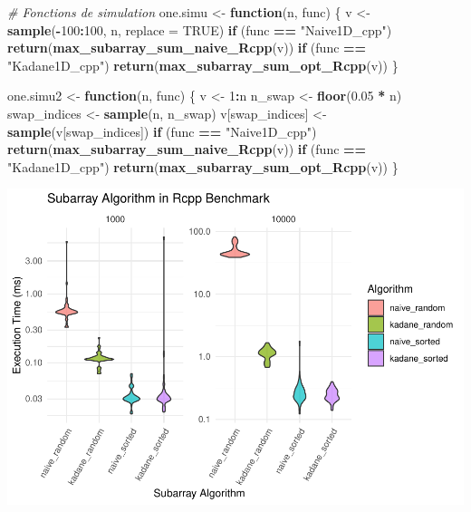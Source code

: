 \documentclass[
]{article}
\newenvironment{Shaded}{\begin{snugshade}}{\end{snugshade}}
\newcommand{\AttributeTok}[1]{\textcolor[rgb]{0.13,0.29,0.53}{#1}}
\newcommand{\CommentTok}[1]{\textcolor[rgb]{0.56,0.35,0.01}{\textit{#1}}}
\newcommand{\ConstantTok}[1]{\textcolor[rgb]{0.56,0.35,0.01}{#1}}
\newcommand{\ControlFlowTok}[1]{\textcolor[rgb]{0.13,0.29,0.53}{\textbf{#1}}}
\newcommand{\DecValTok}[1]{\textcolor[rgb]{0.00,0.00,0.81}{#1}}
\newcommand{\FloatTok}[1]{\textcolor[rgb]{0.00,0.00,0.81}{#1}}
\newcommand{\FunctionTok}[1]{\textcolor[rgb]{0.13,0.29,0.53}{\textbf{#1}}}
\newcommand{\NormalTok}[1]{#1}
\newcommand{\OtherTok}[1]{\textcolor[rgb]{0.56,0.35,0.01}{#1}}
\newcommand{\SpecialCharTok}[1]{\textcolor[rgb]{0.81,0.36,0.00}{\textbf{#1}}}
\newcommand{\StringTok}[1]{\textcolor[rgb]{0.31,0.60,0.02}{#1}}
\begin{document}
\begin{Shaded}
\begin{Highlighting}[]
\CommentTok{\# Fonctions de simulation}
\NormalTok{one.simu }\OtherTok{\textless{}{-}} \ControlFlowTok{function}\NormalTok{(n, func) \{}
\NormalTok{  v }\OtherTok{\textless{}{-}} \FunctionTok{sample}\NormalTok{(}\SpecialCharTok{{-}}\DecValTok{100}\SpecialCharTok{:}\DecValTok{100}\NormalTok{, n, }\AttributeTok{replace =} \ConstantTok{TRUE}\NormalTok{)}
  \ControlFlowTok{if}\NormalTok{ (func }\SpecialCharTok{==} \StringTok{"Naive1D\_cpp"}\NormalTok{) }\FunctionTok{return}\NormalTok{(}\FunctionTok{max\_subarray\_sum\_naive\_Rcpp}\NormalTok{(v))}
  \ControlFlowTok{if}\NormalTok{ (func }\SpecialCharTok{==} \StringTok{"Kadane1D\_cpp"}\NormalTok{) }\FunctionTok{return}\NormalTok{(}\FunctionTok{max\_subarray\_sum\_opt\_Rcpp}\NormalTok{(v))}
\NormalTok{\}}

\NormalTok{one.simu2 }\OtherTok{\textless{}{-}} \ControlFlowTok{function}\NormalTok{(n, func) \{}
\NormalTok{  v }\OtherTok{\textless{}{-}} \DecValTok{1}\SpecialCharTok{:}\NormalTok{n}
\NormalTok{  n\_swap }\OtherTok{\textless{}{-}} \FunctionTok{floor}\NormalTok{(}\FloatTok{0.05} \SpecialCharTok{*}\NormalTok{ n)}
\NormalTok{  swap\_indices }\OtherTok{\textless{}{-}} \FunctionTok{sample}\NormalTok{(n, n\_swap)}
\NormalTok{  v[swap\_indices] }\OtherTok{\textless{}{-}} \FunctionTok{sample}\NormalTok{(v[swap\_indices])}
  \ControlFlowTok{if}\NormalTok{ (func }\SpecialCharTok{==} \StringTok{"Naive1D\_cpp"}\NormalTok{) }\FunctionTok{return}\NormalTok{(}\FunctionTok{max\_subarray\_sum\_naive\_Rcpp}\NormalTok{(v))}
  \ControlFlowTok{if}\NormalTok{ (func }\SpecialCharTok{==} \StringTok{"Kadane1D\_cpp"}\NormalTok{) }\FunctionTok{return}\NormalTok{(}\FunctionTok{max\_subarray\_sum\_opt\_Rcpp}\NormalTok{(v))}
\NormalTok{\}}
\end{Highlighting}
\end{Shaded}

\includegraphics{MaxSubarray1D_files/figure-latex/benchmark2-1.pdf}
\end{document}
